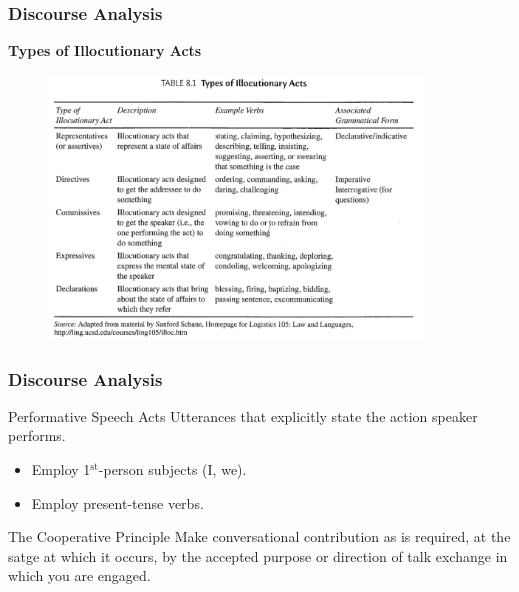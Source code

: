 \documentclass{beamer}
\begin{document}
\begin{frame}
\frametitle{Discourse Analysis}
\textbf{Types of Illocutionary Acts}
\begin{figure}[!htbp]
\center
\includegraphics[width=10cm]{illo.png}
\end{figure}
\end{frame}
\begin{frame}
\frametitle{Discourse Analysis}
\begin{block}{Performative Speech Acts}
Utterances that explicitly state the action speaker performs.
\begin{itemize}
\item Employ 1$^{\text{st}}$-person subjects (I, we).
\item Employ present-tense verbs.
\end{itemize}
\end{block}

\begin{block}{The Cooperative Principle}
Make conversational contribution as is required, at the satge at which it occurs, by the accepted purpose or direction of talk exchange in which you are engaged.
\end{block}
\end{frame}
\end{document}

